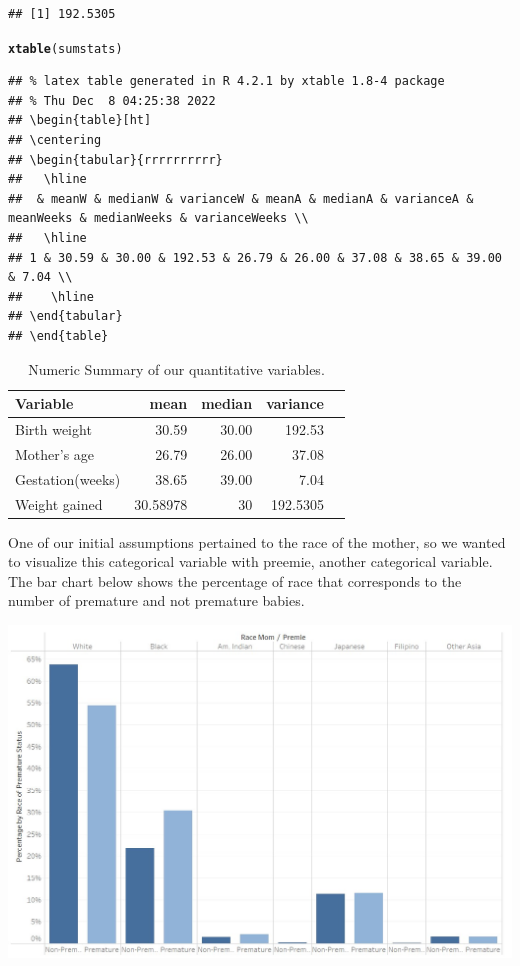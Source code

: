 \documentclass{article}\usepackage[]{graphicx}\usepackage[]{xcolor}
\makeatletter
\newcommand{\hlstd}[1]{\textcolor[rgb]{0.345,0.345,0.345}{#1}}%
\newcommand{\hlkwd}[1]{\textcolor[rgb]{0.737,0.353,0.396}{\textbf{#1}}}%
\newenvironment{kframe}{%
 \def\at@end@of@kframe{}%
 \ifinner\ifhmode%
  \def\at@end@of@kframe{\end{minipage}}%
  \begin{minipage}{\columnwidth}%
 \fi\fi%
 \def\FrameCommand##1{\hskip\@totalleftmargin \hskip-\fboxsep
 \colorbox{shadecolor}{##1}\hskip-\fboxsep
     \hskip-\linewidth \hskip-\@totalleftmargin \hskip\columnwidth}%
 \MakeFramed {\advance\hsize-\width
   \@totalleftmargin\z@ \linewidth\hsize
   \@setminipage}}%
 {\par\unskip\endMakeFramed%
 \at@end@of@kframe}
\newenvironment{knitrout}{}{} %
\makeatother
\begin{document}
\begin{enumerate}[a.]
\begin{knitrout}
\begin{kframe}
\begin{verbatim}
## [1] 192.5305
\end{verbatim}
\begin{alltt}
\hlkwd{xtable}\hlstd{(sumstats)}
\end{alltt}
\begin{verbatim}
## % latex table generated in R 4.2.1 by xtable 1.8-4 package
## % Thu Dec  8 04:25:38 2022
## \begin{table}[ht]
## \centering
## \begin{tabular}{rrrrrrrrrr}
##   \hline
##  & meanW & medianW & varianceW & meanA & medianA & varianceA & meanWeeks & medianWeeks & varianceWeeks \\ 
##   \hline
## 1 & 30.59 & 30.00 & 192.53 & 26.79 & 26.00 & 37.08 & 38.65 & 39.00 & 7.04 \\ 
##    \hline
## \end{tabular}
## \end{table}
\end{verbatim}
\end{kframe}
\end{knitrout}

\begin{table}[H]
\centering
\begin{tabular}{lrrrr}
  \hline
  Variable & mean & median & variance \\ 
  \hline
  Birth weight & 30.59 & 30.00 & 192.53\\
  Mother's age & 26.79 & 26.00 & 37.08 \\
  Gestation(weeks) & 38.65 & 39.00 & 7.04 \\ 
  Weight gained & 30.58978 & 30 & 192.5305 \\
  \hline
\end{tabular}
\caption{Numeric Summary of our quantitative variables.}
\end{table}

One of our initial assumptions pertained to the race of the mother, so we wanted to visualize this categorical variable with preemie, another categorical variable. The bar chart below shows the percentage of race that corresponds to the number of premature and not premature babies. 

\includegraphics{./RacePremiePercent.jpg}


\end{enumerate}
\end{document}
